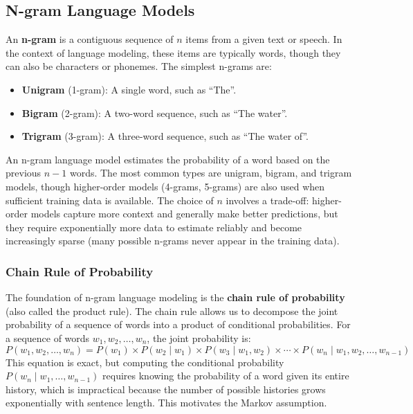 \documentclass[11pt,a4paper]{article}
\begin{document}
\subsection{N-gram Language Models}

An \textbf{n-gram} is a contiguous sequence of $n$ items from a given text or speech. In the context of language modeling, these items are typically words, though they can also be characters or phonemes. The simplest n-grams are:
\begin{itemize}
    \item \textbf{Unigram} (1-gram): A single word, such as ``The''.
    \item \textbf{Bigram} (2-gram): A two-word sequence, such as ``The water''.
    \item \textbf{Trigram} (3-gram): A three-word sequence, such as ``The water of''.
\end{itemize}

An n-gram language model estimates the probability of a word based on the previous $n-1$ words. The most common types are unigram, bigram, and trigram models, though higher-order models (4-grams, 5-grams) are also used when sufficient training data is available. The choice of $n$ involves a trade-off: higher-order models capture more context and generally make better predictions, but they require exponentially more data to estimate reliably and become increasingly sparse (many possible n-grams never appear in the training data).

\subsubsection{Chain Rule of Probability}

The foundation of n-gram language modeling is the \textbf{chain rule of probability} (also called the product rule). The chain rule allows us to decompose the joint probability of a sequence of words into a product of conditional probabilities. For a sequence of words $w_1, w_2, \ldots, w_n$, the joint probability is:
\[
P(w_1, w_2, \ldots, w_n) = P(w_1) \times P(w_2 \mid w_1) \times P(w_3 \mid w_1, w_2) \times \cdots \times P(w_n \mid w_1, w_2, \ldots, w_{n-1})
\]
This equation is exact, but computing the conditional probability $P(w_n \mid w_1, \ldots, w_{n-1})$ requires knowing the probability of a word given its entire history, which is impractical because the number of possible histories grows exponentially with sentence length. This motivates the Markov assumption.
\end{document}

